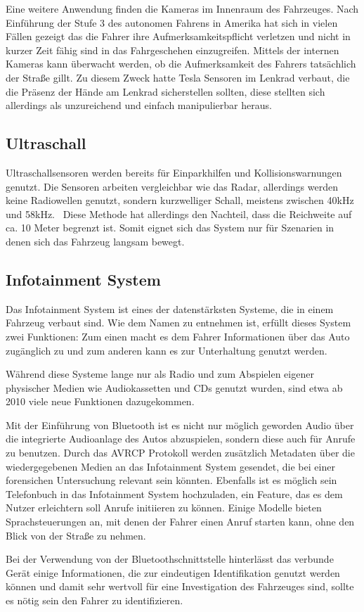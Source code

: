 \documentclass[conference,compsoc,final,a4paper]{IEEEtran}
\begin{document}
Eine weitere Anwendung finden die Kameras im Innenraum des Fahrzeuges.
Nach Einführung der Stufe 3 des autonomen Fahrens in Amerika hat sich in vielen Fällen gezeigt das die Fahrer
ihre Aufmerksamkeitspflicht verletzen und nicht in kurzer Zeit fähig sind in das Fahrgeschehen einzugreifen.
Mittels der internen Kameras kann überwacht werden, ob die Aufmerksamkeit des Fahrers tatsächlich der Straße gillt.
Zu diesem Zweck hatte Tesla Sensoren im Lenkrad verbaut, die die Präsenz der Hände am Lenkrad sicherstellen sollten,
diese stellten sich allerdings als unzureichend und einfach manipulierbar heraus.~\cite{Trudell2021}

\subsection{Ultraschall}

Ultraschallsensoren werden bereits für Einparkhilfen und Kollisionswarnungen genutzt.
Die Sensoren arbeiten vergleichbar wie das Radar, allerdings werden keine Radiowellen genutzt,
sondern kurzwelliger Schall, meistens zwischen 40kHz und 58kHz.~\cite{Zhaohua2020}
Diese Methode hat allerdings den Nachteil, dass die Reichweite auf ca. 10 Meter begrenzt ist. Somit eignet sich das System nur
für Szenarien in denen sich das Fahrzeug langsam bewegt.~\cite{Petit2022}

\subsection{Infotainment System}

Das Infotainment System ist eines der datenstärksten Systeme, die in einem Fahrzeug verbaut sind.
Wie dem Namen zu entnehmen ist, erfüllt dieses System zwei Funktionen:
Zum einen macht es dem Fahrer Informationen über das Auto zugänglich zu und zum anderen kann es zur Unterhaltung genutzt werden.

Während diese Systeme lange nur als Radio und zum Abspielen eigener physischer Medien wie Audiokassetten und CDs genutzt wurden,
sind etwa ab 2010 viele neue Funktionen dazugekommen.~\cite{Rossi2021}\par

Mit der Einführung von Bluetooth ist es nicht nur möglich geworden Audio über die integrierte Audioanlage des Autos abzuspielen,
sondern diese auch für Anrufe zu benutzen. Durch das \ac{AVRCP} Protokoll werden zusätzlich Metadaten über die wiedergegebenen Medien
an das Infotainment System gesendet, die bei einer forensichen Untersuchung relevant sein könnten.
Ebenfalls ist es möglich sein Telefonbuch in das Infotainment System hochzuladen, ein Feature, das es dem Nutzer erleichtern soll
Anrufe initiieren zu können. Einige Modelle bieten Sprachsteuerungen an, mit denen der Fahrer einen Anruf starten kann, ohne den Blick von
der Straße zu nehmen.\par
Bei der Verwendung von der Bluetoothschnittstelle hinterlässt das verbunde Gerät einige Informationen, die zur eindeutigen Identifikation
genutzt werden können und damit sehr wertvoll für eine Investigation des Fahrzeuges sind, sollte es nötig sein den Fahrer zu identifizieren.
\end{document}
